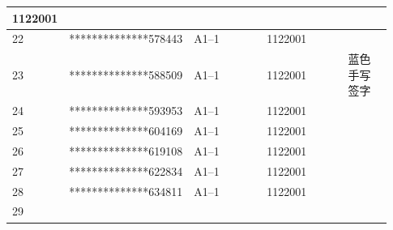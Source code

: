 \documentclass[UTF8,10pt,a4paper,fontset=fandol]{ctexart}
\newcommand{\fieldvalue}[1]{#1}
\newcommand{\handwritten}[1]{#1}
\begin{document}
\begin{tabular}{|p{0.10\linewidth}|p{0.29\linewidth}|p{0.20\linewidth}|p{0.22\linewidth}|p{0.12\linewidth}|}
\fieldvalue{1122001}
&\\
\hline
22 &
\fieldvalue{**************578443}
&
\fieldvalue{A1--1}
&
\fieldvalue{1122001}
&\\
\hline
23 &
\fieldvalue{**************588509}
&
\fieldvalue{A1--1}
&
\fieldvalue{1122001}
&
\fieldvalue{\handwritten{蓝色手写签字}}
\\
\hline
24 &
\fieldvalue{**************593953}
&
\fieldvalue{A1--1}
&
\fieldvalue{1122001}
&\\
\hline
25 &
\fieldvalue{**************604169}
&
\fieldvalue{A1--1}
&
\fieldvalue{1122001}
&\\
\hline
26 &
\fieldvalue{**************619108}
&
\fieldvalue{A1--1}
&
\fieldvalue{1122001}
&\\
\hline
27 &
\fieldvalue{**************622834}
&
\fieldvalue{A1--1}
&
\fieldvalue{1122001}
&\\
\hline
28 &
\fieldvalue{**************634811}
&
\fieldvalue{A1--1}
&
\fieldvalue{1122001}
&\\
\hline
29 &

\end{tabular}
\end{document}
